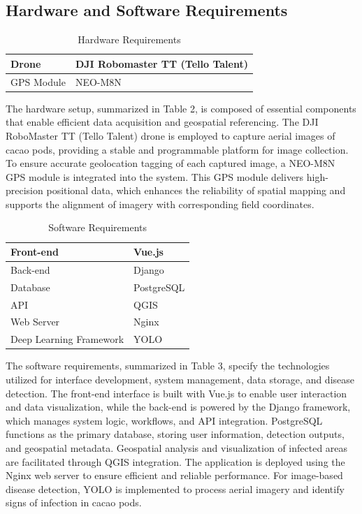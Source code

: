 	
	\subsection{Hardware and Software Requirements}
	
	\begin{table}[H]
		\centering
		\caption{Hardware Requirements}
		\label{tab:hardreq}
		\begin{tabular}{ll}
			\toprule
			Drone & DJI Robomaster TT (Tello Talent) \\
			\midrule
			GPS Module & NEO-M8N \\
			\bottomrule
		\end{tabular}
	\end{table}
	
	The hardware setup, summarized in Table 2, is composed of essential components that enable efficient data acquisition and geospatial referencing. The DJI RoboMaster TT (Tello Talent) drone is employed to capture aerial images of cacao pods, providing a stable and programmable platform for image collection. To ensure accurate geolocation tagging of each captured image, a NEO-M8N GPS module is integrated into the system. This GPS module delivers high-precision positional data, which enhances the reliability of spatial mapping and supports the alignment of imagery with corresponding field coordinates.
	
	\begin{table}[H]
		\centering
		\caption{Software Requirements}
		\label{tab:softreq}
		\begin{tabular}{ll}
			\toprule
			Front-end & Vue.js \\
			\midrule
			Back-end & Django \\
			\midrule
			Database & PostgreSQL \\
			\midrule
			API & QGIS \\
			\midrule
			Web Server & Nginx \\
			\midrule
			Deep Learning Framework & YOLO \\
			\bottomrule
		\end{tabular}
	\end{table}
	
	The software requirements, summarized in Table 3, specify the technologies utilized for interface development, system management, data storage, and disease detection. The front-end interface is built with Vue.js to enable user interaction and data visualization, while the back-end is powered by the Django framework, which manages system logic, workflows, and API integration. PostgreSQL functions as the primary database, storing user information, detection outputs, and geospatial metadata. Geospatial analysis and visualization of infected areas are facilitated through QGIS integration. The application is deployed using the Nginx web server to ensure efficient and reliable performance. For image-based disease detection, YOLO is implemented to process aerial imagery and identify signs of infection in cacao pods.
	
